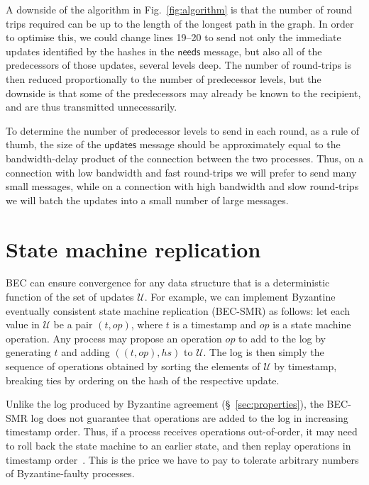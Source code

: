 \documentclass[manuscript,anonymous]{acmart}
\begin{document}
A downside of the algorithm in Fig.~\ref{fig:algorithm} is that the number of round trips required can be up to the length of the longest path in the graph.
In order to optimise this, we could change lines 19--20 to send not only the immediate updates identified by the hashes in the $\mathsf{needs}$ message, but also all of the predecessors of those updates, several levels deep.
The number of round-trips is then reduced proportionally to the number of predecessor levels, but the downside is that some of the predecessors may already be known to the recipient, and are thus transmitted unnecessarily.

To determine the number of predecessor levels to send in each round, as a rule of thumb, the size of the $\mathsf{updates}$ message should be approximately equal to the bandwidth-delay product of the connection between the two processes.
Thus, on a connection with low bandwidth and fast round-trips we will prefer to send many small messages, while on a connection with high bandwidth and slow round-trips we will batch the updates into a small number of large messages.


\section{State machine replication}\label{sec:smr}

BEC can ensure convergence for any data structure that is a deterministic function of the set of updates $\mathcal{U}$.
For example, we can implement Byzantine eventually consistent state machine replication (BEC-SMR) as follows: let each value in $\mathcal{U}$ be a pair $(t, \mathit{op})$, where $t$ is a timestamp and $\mathit{op}$ is a state machine operation.
Any process may propose an operation $op$ to add to the log by generating $t$ and adding $((t, \mathit{op}), \mathit{hs})$ to $\mathcal{U}$.
The log is then simply the sequence of operations obtained by sorting the elements of $\mathcal{U}$ by timestamp, breaking ties by ordering on the hash of the respective update.

Unlike the log produced by Byzantine agreement (\S~\ref{sec:properties}), the BEC-SMR log does not guarantee that operations are added to the log in increasing timestamp order.
Thus, if a process receives operations out-of-order, it may need to roll back the state machine to an earlier state, and then replay operations in timestamp order~\cite{Jefferson:1985em}.
This is the price we have to pay to tolerate arbitrary numbers of Byzantine-faulty processes.
\end{document}
